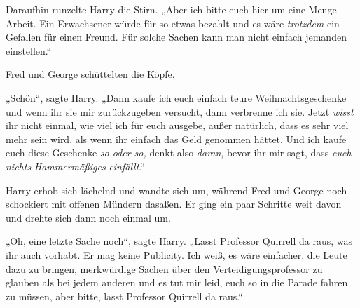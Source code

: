 Daraufhin runzelte Harry die Stirn.
„Aber ich bitte euch hier um eine Menge Arbeit. Ein Erwachsener würde für so etwas bezahlt und es wäre \emph{trotzdem} ein Gefallen für einen Freund. Für solche Sachen kann man nicht einfach jemanden einstellen.“

Fred und George schüttelten die Köpfe.

„Schön“, sagte Harry.
„Dann kaufe ich euch einfach teure Weihnachtsgeschenke und wenn ihr sie mir zurückzugeben versucht, dann verbrenne ich sie. Jetzt \emph{wisst} ihr nicht einmal, wie viel ich für euch ausgebe, außer natürlich, dass es sehr viel mehr sein wird, als wenn ihr einfach das Geld genommen hättet. Und ich kaufe euch diese Geschenke \emph{so oder so,} denkt also \emph{daran}, bevor ihr mir sagt, dass \emph{euch nichts} \emph{Hammermäßiges} \emph{einfällt}.“%

Harry erhob sich lächelnd und wandte sich um, während Fred und George noch schockiert mit offenen Mündern dasaßen. Er ging ein paar Schritte weit davon und drehte sich dann noch einmal um.

„Oh, eine letzte Sache noch“, sagte Harry.
„Lasst Professor Quirrell da raus, was ihr auch vorhabt. Er mag keine Publicity. Ich weiß, es wäre einfacher, die Leute dazu zu bringen, merkwürdige Sachen über den Verteidigungsprofessor zu glauben als bei jedem anderen und es tut mir leid, euch so in die Parade fahren zu müssen, aber bitte, lasst Professor Quirrell da raus.“

